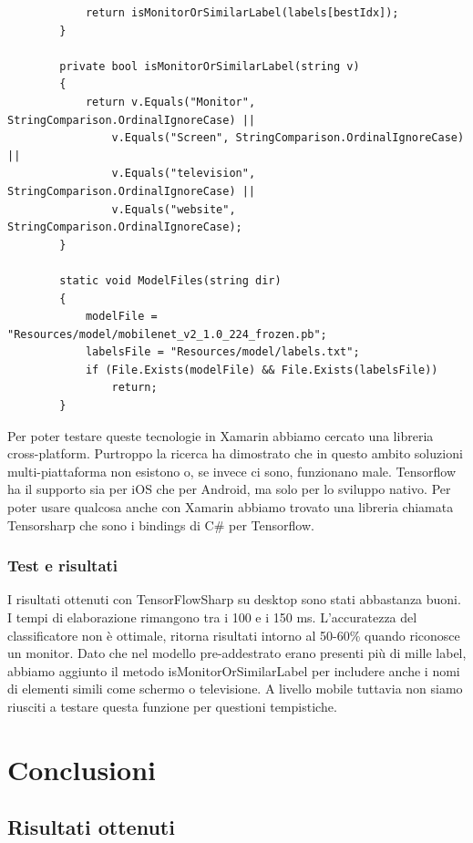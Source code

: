 \documentclass[twoside]{supsistudent}
\begin{document}
\begin{lstlisting}
            return isMonitorOrSimilarLabel(labels[bestIdx]);
        }

        private bool isMonitorOrSimilarLabel(string v)
        {
            return v.Equals("Monitor", StringComparison.OrdinalIgnoreCase) ||
                v.Equals("Screen", StringComparison.OrdinalIgnoreCase) ||
                v.Equals("television", StringComparison.OrdinalIgnoreCase) ||
                v.Equals("website", StringComparison.OrdinalIgnoreCase);
        }

        static void ModelFiles(string dir)
        {
            modelFile = "Resources/model/mobilenet_v2_1.0_224_frozen.pb";
            labelsFile = "Resources/model/labels.txt";
            if (File.Exists(modelFile) && File.Exists(labelsFile))
                return;
        }
\end{lstlisting}

Per poter testare queste tecnologie in Xamarin abbiamo cercato una libreria cross-platform. Purtroppo la ricerca ha dimostrato che in questo ambito soluzioni multi-piattaforma non esistono o, se invece ci sono, funzionano male. Tensorflow ha il supporto sia per iOS che per Android, ma solo per lo sviluppo nativo. 
Per poter usare qualcosa anche con Xamarin abbiamo trovato una libreria chiamata Tensorsharp che sono i bindings di C\# per Tensorflow. 

\subsection{Test e risultati}%
I risultati ottenuti con TensorFlowSharp su desktop sono stati abbastanza buoni. I tempi di elaborazione rimangono tra i 100 e i 150 ms. L'accuratezza del classificatore non è ottimale, ritorna risultati intorno al 50-60\% quando riconosce un monitor. Dato che nel modello pre-addestrato erano presenti più di mille label, abbiamo aggiunto il metodo isMonitorOrSimilarLabel per includere anche i nomi di elementi simili come schermo o televisione. A livello mobile tuttavia non siamo riusciti a testare questa funzione per questioni tempistiche.

\chapter{Conclusioni}
\section{Risultati ottenuti}
\end{document}
